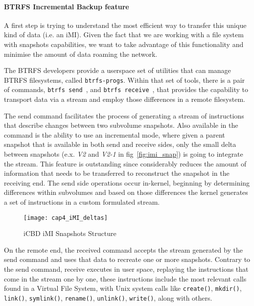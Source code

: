 \paragraph{BTRFS Incremental Backup feature}
\label{par:impl_incremental_btrfs}

A first step is trying to understand the most efficient way to transfer this unique kind of data (i.e. an iMI). Given the fact that we are working with a file system with snapshots capabilities, we want to take advantage of this functionality and minimise the amount of data roaming the network.

The BTRFS developers provide a userspace set of utilities that can manage BTRFS filesystems, called \texttt{btrfs-progs}. Within that set of tools, there is a pair of commands, \texttt{btrfs send}~\cite{btrfs_send}, and \texttt{btrfs receive}~\cite{btrfs_receive}, that provides the capability to transport data via a stream and employ those differences in a remote filesystem. 

The send command facilitates the process of generating a stream of instructions that describe changes between two subvolume snapshots. Also available in the command is the ability to use an incremental mode, where given a parent snapshot that is available in both send and receive sides, only the small delta between snapshots (e.x. \textit{V2} and \textit{V2-1} in fig~\ref{fig:imi_snap}) is going to integrate the stream. This feature is outstanding since considerably reduces the amount of information that needs to be transferred to reconstruct the snapshot in the receiving end. The send side operations occur in-kernel, beginning by determining differences within subvolumes and based on those differences the kernel generates a set of instructions in a custom formulated stream.

\begin{figure}[htbp]
    \centering
    \texttt{[image: cap4\_iMI\_deltas]}
    \caption{iCBD iMI Snapshots Structure}
    \label{fig:icbd_rep_imi_snap}
\end{figure}
\newpage

On the remote end, the received command accepts the stream generated by the send command and uses that data to recreate one or more snapshots. Contrary to the send command, receive executes in user space, replaying the instructions that come in the stream one by one, these instructions include the most relevant calls found in a Virtual File System, with Unix system calls like \texttt{create()}, \texttt{mkdir()}, \texttt{link()}, \texttt{symlink()}, \texttt{rename()}, \texttt{unlink()}, \texttt{write()}, along with others.~\cite{btrfs_design}


